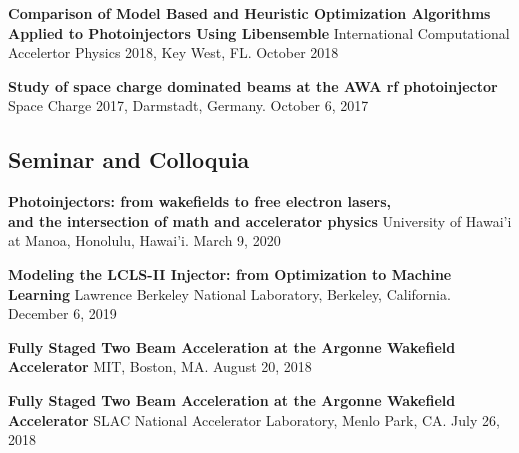 \documentclass[11pt,a4paper,sans]{moderncv}        %
\begin{document}
\textbf{Comparison of Model Based and Heuristic Optimization Algorithms \newline
	Applied to Photoinjectors Using Libensemble}\newline
International Computational Accelertor Physics 2018, Key West, FL. October 2018
\vspace{0.3em}

\textbf{Study of space charge dominated beams at the AWA rf photoinjector}\newline
Space Charge 2017, Darmstadt, Germany. October 6, 2017
\vspace{0.3em}

\subsection{Seminar and Colloquia}


\textbf{Photoinjectors: from wakefields to free electron lasers,\\ and the intersection of math and accelerator physics}\newline
University of Hawai'i at Manoa, Honolulu, Hawai'i. March 9, 2020
\vspace{0.3em}

\textbf{Modeling the LCLS-II Injector: from Optimization to Machine Learning}\newline
Lawrence Berkeley National Laboratory, Berkeley, California. December 6, 2019
\vspace{0.3em}


\textbf{Fully Staged Two Beam Acceleration at the Argonne Wakefield Accelerator}\newline
MIT, Boston, MA. August 20, 2018
\vspace{0.3em}

\textbf{Fully Staged Two Beam Acceleration at the Argonne Wakefield Accelerator}\newline
SLAC National Accelerator Laboratory, Menlo Park, CA. July 26, 2018
\vspace{0.3em}
\end{document}
